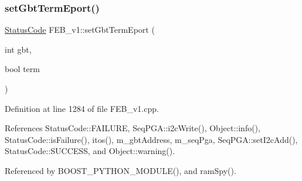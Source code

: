 \subsubsection{\texorpdfstring{set\+Gbt\+Term\+Eport()}{setGbtTermEport()}}
{\footnotesize\ttfamily \hyperlink{classStatusCode}{Status\+Code} F\+E\+B\+\_\+v1\+::set\+Gbt\+Term\+Eport (\begin{DoxyParamCaption}\item[{int}]{gbt,  }\item[{bool}]{term }\end{DoxyParamCaption})}



Definition at line 1284 of file F\+E\+B\+\_\+v1.\+cpp.



References Status\+Code\+::\+F\+A\+I\+L\+U\+RE, Seq\+P\+G\+A\+::i2c\+Write(), Object\+::info(), Status\+Code\+::is\+Failure(), itos(), m\+\_\+gbt\+Address, m\+\_\+seq\+Pga, Seq\+P\+G\+A\+::set\+I2c\+Add(), Status\+Code\+::\+S\+U\+C\+C\+E\+SS, and Object\+::warning().



Referenced by B\+O\+O\+S\+T\+\_\+\+P\+Y\+T\+H\+O\+N\+\_\+\+M\+O\+D\+U\+L\+E(), and ram\+Spy().


